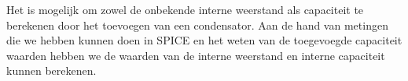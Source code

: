 \documentclass{article}
\begin{document}
Het is mogelijk om zowel de onbekende interne weerstand als capaciteit te berekenen door het toevoegen van een condensator. Aan de hand van metingen die we hebben kunnen doen in SPICE en het weten van de toegevoegde capaciteit waarden hebben we de waarden van de interne weerstand en interne capaciteit kunnen berekenen.
\end{document}
